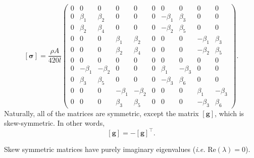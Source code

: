 \[
\mathbf{[\sigma]} = 
\frac{\rho A}{420l}\begin{pmatrix}
 0 & 0 &  0 & 0 &  0 & 0 & 0 & 0 & 0 &  0\\
 0 & \beta_1 & \beta_2 & 0 &  0 & 0 &  -\beta_1  & \beta_3 & 0 & 0\\
 0 & \beta_2 & \beta_4 & 0 &  0 & 0 & -\beta_2 & \beta_5 & 0 & 0\\
 0 & 0 & 0 & \beta_1 & \beta_2 & 0 & 0 & 0 &  -\beta_1  & \beta_3 \\
 0 & 0 & 0 & \beta_2 & \beta_4 & 0 & 0 & 0 & -\beta_2 & \beta_5 \\
 0 & 0 & 0 & 0 & 0 & 0 & 0 & 0 & 0 & 0\\
 0 & -\beta_1 & -\beta_2 & 0 & 0 & 0 & \beta_1 & -\beta_3 & 0 & 0\\
 0 & \beta_3 & \beta_5 & 0 & 0 & 0 & -\beta_3 & \beta_6 & 0 & 0\\
 0 & 0 & 0 & -\beta_1 & -\beta_2 & 0 & 0 & 0 & \beta_1 & -\beta_3 \\
 0 & 0 & 0 & \beta_3 & \beta_5  & 0 & 0 & 0 & -\beta_3 &  \beta_6
\end{pmatrix}.
\]
Naturally, all of the matrices are symmetric, except the matrix $\mathbf{[g]}$, which is skew-symmetric. In other words, 
\begin{equation}
\mathbf{[g]} = -\mathbf{[g]}^\top.
\end{equation}
\begin{lemma}
Skew symmetric matrices have purely imaginary eigenvalues (\emph{i.e.} $\text{Re}(\lambda)=0$). 
\end{lemma}
